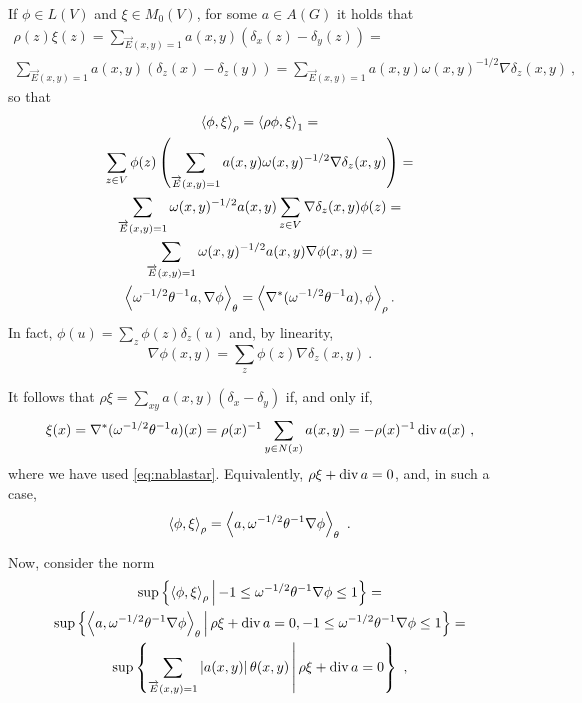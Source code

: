 \documentclass[12pt,a4paper]{amsart}
\theoremstyle{definition}
\begin{document}
If $\phi \in L(V)$ and $\xi \in M_0(V)$, for some $a \in A(G)$ it
holds that
\begin{multline*}
  \rho(z)\xi(z) =
  \sum_{\overrightarrow E(x,y)=1} a(x,y) (\delta_x(z) - \delta_y(z)) = \\
  \sum_{\overrightarrow E(x,y)=1} a(x,y) (\delta_z(x) - \delta_z(y)) =
  \sum_{\overrightarrow E(x,y)=1} a(x,y) \omega(x,y)^{-1/2} \nabla
  \delta_z (x,y) \ ,
\end{multline*}
so that
\begin{multline*}
  \left\langle\phi,\xi\right\rangle_{\rho} = \left\langle\rho\phi,\xi\right\rangle_{1} = \\ \sum_{z \in V} \phi(z)
  \left(\sum_{\overrightarrow E(x,y)=1}
    a(x,y) \omega(x,y)^{-1/2} \nabla \delta_z (x,y)\right) = \\
  \sum_{\overrightarrow E(x,y)=1} \omega(x,y) ^{-1/2} a(x,y) \sum_{z
    \in V} \nabla \delta_z (x,y) \phi(z) = \\
  \sum_{\overrightarrow E(x,y)=1} \omega(x,y) ^{-1/2} a(x,y) \nabla
  \phi (x,y) = \\ \left\langle\omega^{-1/2}\theta^{-1} a,\nabla \phi\right\rangle_{\theta} = \left\langle\nabla^* (\omega^{-1/2} \theta^{-1} a),\phi\right\rangle_{\rho} .
\end{multline*}
In fact, $\phi(u) = \sum_z \phi (z) \delta_z(u)$ and,
by linearity,
\begin{equation*}
 \nabla \phi (x,y) = \sum_z \phi(z)
\nabla \delta_z(x,y) \ .
\end{equation*}

It follows that $\rho \xi = \sum_{xy} a(x,y) (\delta_x-\delta_y)$ if, and
only if,
\begin{equation*}
  \xi(x) =  \nabla^* (\omega^{-1/2} \theta^{-1} a) (x) = \rho(x)^{-1} \sum_{y
    \in N(x)}  a(x,y) = - \rho(x)^{-1} \operatorname*{div} a (x) \ , 
\end{equation*}
where we have used \cref{eq:nablastar}. 
Equivalently, $\rho \xi + \operatorname*{div} a = 0$, and, in such a case,
\begin{equation*}
  \left\langle\phi,\xi\right\rangle_{\rho} = \left\langle a,\omega^{-1/2} \theta^{-1} \nabla
    \phi\right\rangle_{\theta} \ .
\end{equation*}

Now, consider the norm
\begin{multline*}
 \sup\left\{\left\langle\phi,\xi\right\rangle_{\rho} \, \middle| \, -1 \leq \omega^{-1/2} \theta^{-1} \nabla
    \phi \leq 1 \right\} = \\ \sup\left\{\left\langle a,\omega^{-1/2} \theta^{-1} \nabla
    \phi \right\rangle_{\theta} \, \middle| \, \rho \xi + \operatorname*{div} a = 0,
    -1 \leq \omega^{-1/2} \theta^{-1} \nabla
    \phi \leq 1 \right\} = \\
  \sup\left\{\sum_{\overrightarrow E(x,y) = 1} \left\vert a(x,y)\right\vert \theta(x,y) \, \middle| \, \rho \xi + \operatorname*{div} a = 0 \right\} \ ,
\end{multline*}
\end{document}
